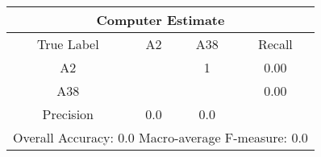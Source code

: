 \begin{tabular}{|c||c|c||c|}
\hline 
\multicolumn{4}{|c|}{Computer Estimate}\\
\hline 
True Label & A2 & A38 & Recall \\
\hline 
A2 &  &1 &  0.00\\
A38 &  & & 0.00\\
\hline 
Precision & 0.0 & 0.0 & \\
\hline 
\multicolumn{4}{|c|}{Overall Accuracy: 0.0 Macro-average F-measure: 0.0}\\
\hline 
\end{tabular} 
